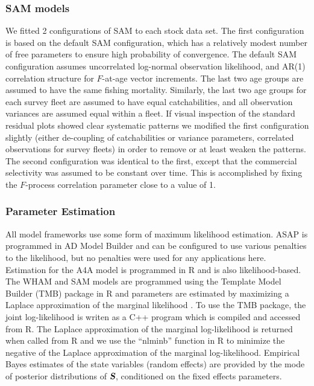 \documentclass[12pt,letterpaper, leqno]{article}
\begin{document}
\subsubsection*{SAM models}
We fitted 2 configurations of SAM to each stock data set. The first configuration is based on the default SAM configuration, which has a relatively modest number of free parameters to ensure high probability of convergence. The default SAM configuration assumes uncorrelated log-normal observation likelihood, and AR(1) correlation structure for $F$-at-age vector increments. The last two age groups are assumed to have the same fishing mortality. Similarly, the last two age groups for each survey fleet are assumed to have equal catchabilities, and all observation variances are assumed equal within a fleet. If visual inspection of the standard residual plots showed clear systematic patterns we modified the first configuration slightly (either de-coupling of catchabilities or variance parameters, correlated observations for survey fleets) in order to remove or at least weaken the patterns.
The second configuration was identical to the first, except that the commercial selectivity was assumed to be constant over time. This is accomplished by fixing the $F$-process correlation parameter close to a value of 1.

\subsubsection*{Parameter Estimation}


All model frameworks use some form of maximum likelihood estimation. ASAP is programmed in AD Model Builder \citep{fournieretal12} and can be configured to use various penalties to the likelihood, but no penalties were used for any applications here. Estimation for the A4A model is programmed in R \citep{R18} and is also likelihood-based. The WHAM and SAM models are programmed using the Template Model Builder (TMB) package in R \citep{kristensenetal16} and parameters are estimated by maximizing a Laplace approximation of the marginal likelihood \citep{skaugfournier06}. To use the TMB package, the joint log-likelihood is writen as a C++ program which is compiled and accessed from R. The Laplace approximation of the marginal log-likelihood is returned when called from R and we use the ``nlminb'' function in R to minimize the negative of the Laplace approximation of the marginal log-likelihood. Empirical Bayes estimates of the state variables (random effects) are provided by the mode of posterior distributions of $\textsl{\textbf{S}}$, conditioned on the fixed effects parameters.
\end{document}
